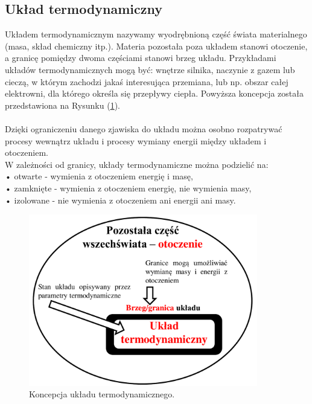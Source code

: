 \documentclass[12pt,a4paper,openright]{report} %
\begin{document}
\subsection{Układ termodynamiczny} 
Układem termodynamicznym nazywamy wyodrębnioną część świata materialnego (masa, skład chemiczny itp.). Materia pozostała poza układem stanowi otoczenie, a granicę pomiędzy dwoma częściami stanowi brzeg układu. Przykładami układów termodynamicznych mogą być: wnętrze silnika, naczynie z gazem lub cieczą, w którym zachodzi jakaś interesująca przemiana, lub np. obszar całej elektrowni, dla którego określa się przepływy ciepła. Powyższa koncepcja została przedstawiona na Rysunku (\ref{2_uk_td}).\\
\\
Dzięki ograniczeniu danego zjawiska do układu można osobno rozpatrywać procesy wewnątrz układu i procesy wymiany energii między układem i otoczeniem. \\
W zależności od granicy, układy termodynamiczne można podzielić na: \\
• otwarte - wymienia z otoczeniem energię i masę, \\
• zamknięte - wymienia z otoczeniem energię, nie wymienia masy, \\
• izolowane - nie wymienia z otoczeniem ani energii ani masy. \\
%
\begin{figure}[h!]
\centering
\includegraphics[width=10cm, clip]{rysunki/2_uk_td}
\caption{Koncepcja układu termodynamicznego.}
\label{2_uk_td}
\end{figure}
%
\end{document}
